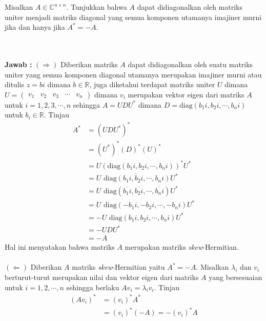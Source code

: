 \documentclass[11pt,a4paper]{article}
\theoremstyle{plain}
\theoremstyle{definition}
\theoremstyle{remark}
\begin{document}
\begin{enumerate}
\begin{enumerate}
\begin{enumerate}
	
	\end{enumerate}
	

	\- \\ \- \\
	\textbf{Jawab :} $(\Rightarrow)$ Diberikan matriks $A$ dapat didiagonalkan oleh suatu matriks uniter yang semua komponen diagonal utamanya merupakan imajiner murni atau ditulis $z=bi$ dimana $b\in \mathbb{R}$, juga diketahui terdapat matriks uniter $U$ dimana $U=\begin{pmatrix}
	v_{1} & v_{2} & v_{3} & \cdots & v_{n}
	\end{pmatrix}$ dimana $v_{i}$ merupakan vektor eigen dari matriks $A$ untuk $i=1,2,3,\cdots,n$ sehingga $A=UDU^*$ dimana $D=\text{diag}(b_{1}i,b_{2}i,\cdots,b_{n}i)$ untuk $b_{i}\in \mathbb{R}$. Tinjau
	\begin{align*}
	A^* &= (UDU^*)^* \\
	&= (U^*)^*(D)^*(U)^* \\
	&= U \left(\text{diag}(b_{1}i,b_{2}i,\cdots,b_{n}i)\right)^* U^* \\
	&= U \overline{\text{ diag}(b_{1}i,b_{2}i,\cdots,b_{n}i)} U^* \\
	&= U \text{ diag}(\overline{b_{1}i},\overline{b_{2}i},\cdots,\overline{b_{n}i}) U^* \\
	&= U \text{ diag}(-b_{1}i,-b_{2}i,\cdots,-b_{n}i) U^* \\
	&= -U \text{ diag}(b_{1}i,b_{2}i,\cdots,b_{n}i) U^* \\
	&= -U D U^* \\
	&= -A
	\end{align*} 
	Hal ini menyatakan bahwa matriks $A$ merupakan matriks \textit{skew}-Hermitian.\\
	\- \\
	$(\Leftarrow)$ Diberikan $A$ matriks \textit{skew}-Hermitian yaitu $A^*=-A$. Misalkan $\lambda_{i}$ dan $v_{i}$ berturut-turut merupakan nilai dan vektor eigen dari matriks $A$ yang bersesuaian untuk $i=1,2,\cdots,n$ sehingga berlaku $Av_{i}=\lambda_{i}v_{i}$. Tinjau
	\begin{align*}
	(Av_{i})^* &= (v_{i})^* A^* \\
	&= (v_{i})^*(-A) = -(v_{i})^*A\\

\end{align*}
\end{enumerate}
\end{enumerate}
\end{document}
